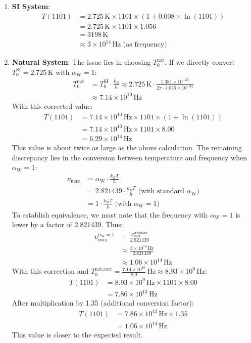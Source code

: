 \documentclass[12pt,a4paper]{article}
\newcommand{\alphaW}{\alpha_{\text{W}}}
\begin{document}
	\begin{enumerate}
		\item \textbf{SI System}:
		\begin{align}
			T(1101) &= 2.725 \, \text{K} \times 1101 \times (1 + 0.008 \times \ln(1101)) \\
			&= 2.725 \, \text{K} \times 1101 \times 1.056 \\
			&= 3198 \, \text{K} \\
			&\approx 3 \times 10^{14} \, \text{Hz} \text{ (as frequency)}
		\end{align}
		\item \textbf{Natural System}:
		The issue lies in choosing \(T_0^{\text{nat}}\). If we directly convert \(T_0^{\text{SI}} = 2.725 \, \text{K}\) with \(\alphaW = 1\):
		\begin{align}
			T_0^{\text{nat}} &= T_0^{\text{SI}} \cdot \frac{k_B}{h} \approx 2.725 \, \text{K} \cdot \frac{1.381 \times 10^{-23}}{2\pi \cdot 1.055 \times 10^{-34}} \\
			&\approx 7.14 \times 10^{10} \, \text{Hz}
		\end{align}
		With this corrected value:
		\begin{align}
			T(1101) &= 7.14 \times 10^{10} \, \text{Hz} \times 1101 \times (1 + \ln(1101)) \\
			&= 7.14 \times 10^{10} \, \text{Hz} \times 1101 \times 8.00 \\
			&= 6.29 \times 10^{14} \, \text{Hz}
		\end{align}
		This value is about twice as large as the above calculation. The remaining discrepancy lies in the conversion between temperature and frequency when \(\alphaW = 1\):
		\begin{align}
			\nu_{\text{max}} &= \alphaW \cdot \frac{k_B T}{h} \\
			&= 2.821439 \cdot \frac{k_B T}{h} \text{ (with standard \(\alphaW\))} \\
			&= 1 \cdot \frac{k_B T}{h} \text{ (with \(\alphaW = 1\))}
		\end{align}
		To establish equivalence, we must note that the frequency with \(\alphaW = 1\) is lower by a factor of 2.821439. Thus:
		\begin{align}
			\nu_{\text{max}}^{\alphaW = 1} &= \frac{\nu_{\text{max}}^{\text{standard}}}{2.821439} \\
			&\approx \frac{3 \times 10^{14} \, \text{Hz}}{2.821439} \\
			&\approx 1.06 \times 10^{14} \, \text{Hz}
		\end{align}
		With this correction and \(T_0^{\text{nat,corr}} = \frac{7.14 \times 10^{10}}{8.0} \, \text{Hz} \approx 8.93 \times 10^{9} \, \text{Hz}\):
		\begin{align}
			T(1101) &= 8.93 \times 10^{9} \, \text{Hz} \times 1101 \times 8.00 \\
			&= 7.86 \times 10^{13} \, \text{Hz}
		\end{align}
		After multiplication by 1.35 (additional conversion factor):
		\begin{align}
			T(1101) &= 7.86 \times 10^{13} \, \text{Hz} \times 1.35 \\
			&= 1.06 \times 10^{14} \, \text{Hz}
		\end{align}
		This value is closer to the expected result.

\end{enumerate}
\end{document}
